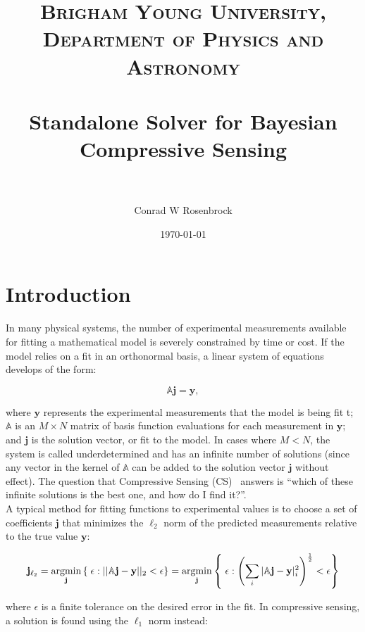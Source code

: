 \documentclass[paper=a4, fontsize=11pt]{scrartcl} %
\title{	
\normalfont \normalsize 
\textsc{Brigham Young University, Department of Physics and Astronomy} \\ [25pt] %
\horrule{0.5pt} \\[0.4cm] %
\huge Standalone Solver for Bayesian Compressive Sensing \\ %
\horrule{2pt} \\[0.5cm] %
}
\author{Conrad W Rosenbrock} %
\date{\normalsize\today} %
\newcommand{\argmin}{\operatornamewithlimits{argmin}}
\numberwithin{equation}{section} %
\numberwithin{figure}{section} %
\numberwithin{table}{section} %
\begin{document}
\maketitle %

\section{Introduction}

In many physical systems, the number of experimental measurements
available for fitting a mathematical model is severely constrained by
time or cost. If the model relies on a fit in an orthonormal basis, a
linear system of equations develops of the form:

\begin{equation}
\label{eq:StandardLinearSystem}
\mathbb{A}\mathbf{j} = \mathbf{y},
\end{equation}

\noindent where $\mathbf{y}$ represents the experimental measurements
that the model is being fit t; $\mathbb{A}$ is an $M \times N$ matrix
of basis function evaluations for each measurement in $\mathbf{y}$; and
$\mathbf{j}$ is the solution vector, or fit to the model. In cases where
$M < N$, the system is called underdetermined and has an
infinite number of solutions (since any vector in the kernel of
$\mathbb{A}$ can be added to the solution vector $\mathbf{j}$ without
effect). The question that Compressive Sensing (CS)~\cite{Candes:2008hb}
 answers is ``which of these infinite solutions is the best one,
 and how do I find it?''.\\

A typical method for fitting functions to experimental values is to
choose a set of coefficients $\mathbf{j}$ that minimizes the $\ell_2$
norm of the predicted measurements relative to the true value $\mathbf{y}$:

\begin{equation}
\label{eq:Ell2Norm}
\mathbf{j}_{\ell_2} = \argmin_{\mathbf{j}} \left\{\; \epsilon :
  ||\mathbb{A}\mathbf{j}-\mathbf{y}||_2 < \epsilon \right\}
= \argmin_{\mathbf{j}} \left\{\; \epsilon : \left(\sum_i |\mathbb{A}\mathbf{j}-\mathbf{y}|_i^2
\right)^{\frac{1}{2}} < \epsilon \right\}
\end{equation}

\noindent where $\epsilon$ is a finite tolerance on the desired error
in the fit. In compressive sensing, a solution is found using the
$\ell_1$ norm instead:
\end{document}
